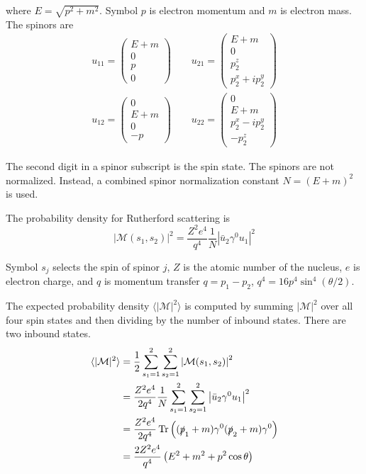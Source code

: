 \documentclass[12pt]{article}
\begin{document}
\noindent
where $E=\sqrt{p^2+m^2}$.
Symbol $p$ is electron momentum and $m$ is electron mass.
The spinors are
\begin{align*}
u_{11}=\begin{pmatrix}E+m\\0\\p\\0\end{pmatrix}
\qquad
u_{21}=\begin{pmatrix}E+m\\0\\p_2^z\\p_2^x+ip_2^y\end{pmatrix}
\\
u_{12}=\begin{pmatrix}0\\E+m\\0\\-p\end{pmatrix}
\qquad
u_{22}=\begin{pmatrix}0\\E+m\\p_2^x-ip_2^y\\-p_2^z\end{pmatrix}
\end{align*}

\noindent
The second digit in a spinor subscript is the spin state.
The spinors are not normalized.
Instead, a combined spinor normalization constant $N=(E+m)^2$ is used.

\bigskip
\noindent
The probability density for Rutherford scattering is
\begin{equation*}
|\mathcal{M}(s_1,s_2)|^2=\frac{Z^2e^4}{q^4}\frac{1}{N}\left|\bar{u}_2\gamma^0 u_1\right|^2
\end{equation*}

\noindent
Symbol $s_j$ selects the spin of spinor $j$,
$Z$ is the atomic number of the nucleus,
$e$ is electron charge,
and $q$ is momentum transfer $q=p_1-p_2$, $q^4=16p^4\sin^4(\theta/2)$.

\bigskip
\noindent
The expected probability density
$\langle\vert\mathcal{M}\vert^2\rangle$
is computed by summing $|\mathcal{M}|^2$
over all four spin states and then dividing by the number of inbound states.
There are two inbound states.
\begin{align*}
\langle\vert\mathcal{M}\vert^2\rangle
&=\frac{1}{2}\sum_{s_1=1}^2\sum_{s_2=1}^2\left|\mathcal{M}(s_1,s_2)\right|^2
\\
&=\frac{Z^2e^4}{2q^4}\frac{1}{N}\sum_{s_1=1}^2\sum_{s_2=1}^2\left|\bar{u}_2\gamma^0 u_1\right|^2
\\
&=\frac{Z^2e^4}{2q^4}\mathop{\rm Tr}\left((\slashed{p}_1+m)\gamma^0(\slashed{p}_2+m)\gamma^0\right)
\\
&=\frac{2Z^2e^4}{q^4}\left(E^2+m^2+p^2\cos\theta\right)
\end{align*}
\end{document}
